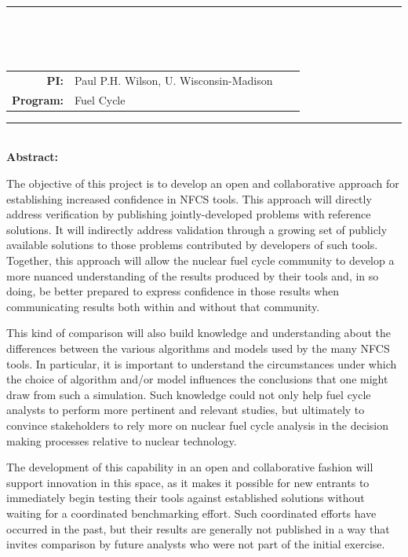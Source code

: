 \documentclass[dvips,12pt]{article}
\begin{document}
\vspace*{0.5in}

\noindent\rule{\textwidth}{1pt}\

\vspace*{0.2in}

\begin{centering}
  \textbf{\large \mytitle}\\
\end{centering}

\vspace*{0.25in}

\noindent
\begin{tabularx}{\textwidth}{rlrl}
   \textbf{PI:} & Paul P.H. Wilson, U. Wisconsin-Madison \\
   \textbf{Program:} & Fuel Cycle
\end{tabularx}



\vspace{0.2in}
\noindent\rule{\textwidth}{1pt}\\

\noindent\textbf{Abstract:} 

The objective of this project is to develop an open and collaborative approach
for establishing increased confidence in \gls{NFCS} tools. This approach will
directly address verification by publishing jointly-developed problems with
reference solutions.  It will indirectly address validation through a growing
set of publicly available solutions to those problems contributed by
developers of such tools.  Together, this approach will allow the nuclear
fuel cycle community to develop a more nuanced understanding of the results
produced by their tools and, in so doing, be better prepared to express
confidence in those results when communicating results both within and without
that community.

This kind of comparison will also build knowledge and understanding about the
differences between the various algorithms and models used by the many
\gls{NFCS}
 tools. In particular, it is important to understand the
circumstances under which the choice of algorithm and/or model influences the
conclusions that one might draw from such a simulation. Such knowledge could
not only help fuel cycle analysts to perform more pertinent and relevant
studies, but ultimately to convince stakeholders to rely more on nuclear fuel
cycle analysis in the decision making processes relative to nuclear
technology.

The development of this capability in an open and collaborative fashion will
support innovation in this space, as it makes it possible for new entrants to
immediately begin testing their tools against established solutions without
waiting for a coordinated benchmarking effort.  Such coordinated efforts have
occurred in the past, but their results are generally not published in a way
that invites comparison by future analysts who were not part of the initial
exercise.
\end{document}
